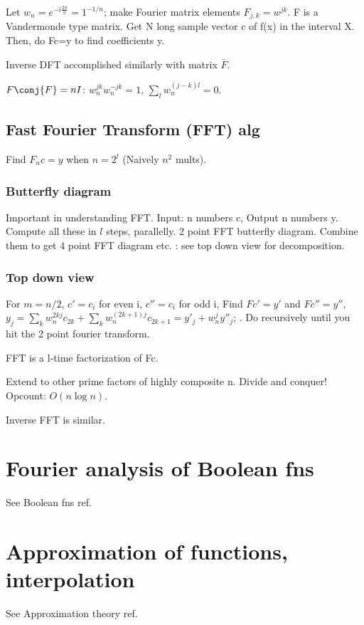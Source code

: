 \documentclass[oneside, article]{memoir}
\begin{document}
Let $w_{n}=e^{-i\frac{2\pi}{n}} = 1^{-1/n}$; make Fourier matrix elements $F_{j,k}=w^{jk}$. F is a Vandermonde type matrix. Get N long sample vector c of f(x) in the interval X. Then, do Fc=y to find coefficients y.

Inverse DFT accomplished similarly with matrix $\bar{F}$.

$F\conj{F}=nI$: $w_{n}^{jk}w_{n}^{-jk} = 1$, $\sum_{l} w_{n}^{(j-k)l} = 0$.

\subsection{Fast Fourier Transform (FFT) alg}
Find $F_{n}c=y$ when $n=2^{l}$ (Naively $n^{2}$ mults).

\subsubsection{Butterfly diagram}
Important in understanding FFT. Input: n numbers c, Output n numbers y. Compute all these in $l$ steps, parallelly. 2 point FFT butterfly diagram. Combine them to get 4 point FFT diagram etc. : see top down view for decomposition.

\subsubsection{Top down view}
For $m=n/2$, $c' = c_{i}$ for even i, $c'' = c_{i}$ for odd i, Find $Fc'=y'$ and $Fc''=y''$, $y_{j} = \sum_{k}w_{n}^{2kj}c_{2k} + \sum_{k}w_{n}^{(2k+1)j}c_{2k+1} = y'_{j} + w_{n}^{j}y''_{j}$; . Do recursively until you hit the 2 point fourier transform.

FFT is a l-time factorization of Fc.

Extend to other prime factors of highly composite n. Divide and conquer! Opcount: $O(n \log n)$.

Inverse FFT is similar.

\section{Fourier analysis of Boolean fns}
See Boolean fns ref.

\section{Approximation of functions, interpolation}
See Approximation theory ref.

% 
% 
\end{document}
